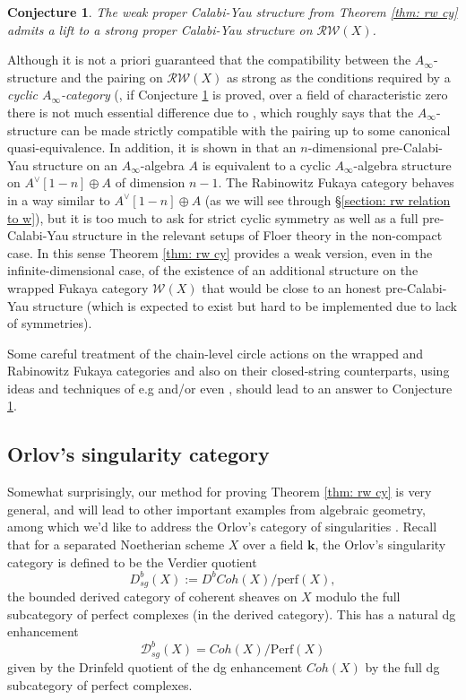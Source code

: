 \documentclass[11pt]{amsproc}
\def\K{{\mathbf{k}}}
\def\w{\mathcal{W}(E)}
\def\dd{\mathcal{D}}
\def\w{\mathcal{W}}
\def\rw{\mathcal{RW}}
\def\ainf{A_\infty}
\def\perf{\mathrm{Perf}}
\newtheorem{conj}[lem]{Conjecture}
\theoremstyle{remark}
\numberwithin{equation}{section}
\begin{document}
\begin{conj}\label{lift to strong cy}
The weak proper Calabi-Yau structure from Theorem \ref{thm: rw cy} admits a lift to a strong proper Calabi-Yau structure on $\rw(X)$.
\end{conj}

Although it is not a priori guaranteed that the compatibility between the $\ainf$-structure and the pairing on $\rw(X)$ as strong as the conditions required by a {\it cyclic $A_{\infty}$-category} (\cites{costello, fukaya_cyclic, cho-lee},
if Conjecture \ref{lift to strong cy} is proved, over a field of characteristic zero there is not much essential difference due to \cite{kontsevich-soibelman},
which roughly says that the $\ainf$-structure can be made strictly compatible with the pairing up to some canonical quasi-equivalence.
In addition, it is shown in \cite{kontsevich-takeda-vlassopoulos} that an $n$-dimensional pre-Calabi-Yau structure on an $\ainf$-algebra $A$ is equivalent to a cyclic $\ainf$-algebra structure on $A^{\vee}[1-n] \oplus A$ of dimension $n-1$.
The Rabinowitz Fukaya category behaves in a way similar to $A^{\vee}[1-n] \oplus A$ (as we will see through \S\ref{section: rw relation to w}),
but it is too much to ask for strict cyclic symmetry as well as a full pre-Calabi-Yau structure in the relevant setups of Floer theory in the non-compact case.
In this sense Theorem \ref{thm: rw cy} provides a weak version, even in the infinite-dimensional case,
of the existence of an additional structure on the wrapped Fukaya category $\w(X)$ that would be close to an honest pre-Calabi-Yau structure (which is expected to exist but hard to be implemented due to lack of symmetries).

Some careful treatment of the chain-level circle actions on the wrapped and Rabinowitz Fukaya categories and also on their closed-string counterparts, using ideas and techniques of e.g \cite{ganatra_cyclic} and/or even \cite{AGV},
should lead to an answer to Conjecture \ref{lift to strong cy}.

\subsection{Orlov's singularity category}

Somewhat surprisingly, our method for proving Theorem \ref{thm: rw cy} is very general,
and will lead to other important examples from algebraic geometry,
among which we'd like to address the Orlov's category of singularities \cite{orlov}.
Recall that for a separated Noetherian scheme $X$ over a field $\K$,
the Orlov's singularity category is defined to be the Verdier quotient
\[
D^{b}_{sg}(X):= D^{b}Coh(X) / \mathrm{perf}(X),
\]
the bounded derived category of coherent sheaves on $X$ modulo the full subcategory of perfect complexes (in the derived category).
This has a natural dg enhancement
\begin{equation}
\dd^{b}_{sg}(X) = Coh(X)/ \perf(X)
\end{equation}
given by the Drinfeld quotient of the dg enhancement $Coh(X)$ by the full dg subcategory of perfect complexes.
\end{document}
